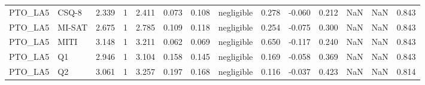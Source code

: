 \begin{tabular}{llrrrrrlrrrrrr}
PTO\_LA5 & CSQ-8 & 2.339 & 1 & 2.411 & 0.073 & 0.108 & negligible & 0.278 & -0.060 & 0.212 & NaN & NaN & 0.843 \\
PTO\_LA5 & MI-SAT & 2.675 & 1 & 2.785 & 0.109 & 0.118 & negligible & 0.254 & -0.075 & 0.300 & NaN & NaN & 0.843 \\
PTO\_LA5 & MITI & 3.148 & 1 & 3.211 & 0.062 & 0.069 & negligible & 0.650 & -0.117 & 0.240 & NaN & NaN & 0.843 \\
PTO\_LA5 & Q1 & 2.946 & 1 & 3.104 & 0.158 & 0.145 & negligible & 0.169 & -0.058 & 0.369 & NaN & NaN & 0.843 \\
PTO\_LA5 & Q2 & 3.061 & 1 & 3.257 & 0.197 & 0.168 & negligible & 0.116 & -0.037 & 0.423 & NaN & NaN & 0.814 \\
\bottomrule
\end{tabular}
